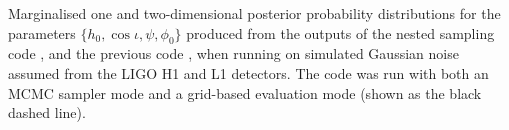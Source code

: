 \label{fig:simnoise_multi}
Marginalised one and two-dimensional posterior probability distributions
for the parameters $\{h_0, \cos{\iota}, \psi, \phi_0\}$
produced from the outputs of the nested sampling code \lppen, and the previous
code \lppe, when running on simulated Gaussian noise assumed from the LIGO H1 and
L1 detectors. The \lppe code was run with both an MCMC sampler mode and a grid-based
evaluation mode (shown as the black dashed line).
